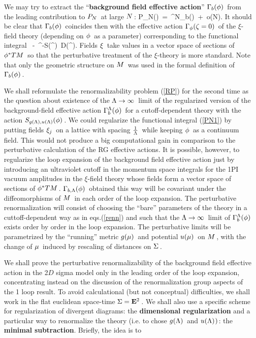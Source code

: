 \label{PN1}
\qqq
We may try to extract the ``{\bf background field
effective action}'' \s${{\Gamma}}_{b}(\phi)\hspace{0.05cm}$ from the leading
contribution to \s$P_N\hspace{0.05cm}$ at large \s$N\hspace{0.05cm}$:
\qq
P_N(\phi)\ =\ \ee^{\m N\s\Ga_{b}(\phi)\ +\ \s o(N)}\s.
\label{efab}
\qqq
It should be clear that \s$\Gamma_{b}(\phi)\hspace{0.05cm}$ coincides
then with the effective action \s${{\Gamma}}_\phi(\zeta=0)\hspace{0.05cm}$
of the \s$\xi$-field theory (depending on \s$\phi\hspace{0.05cm}$ as
a parameter) corresponding to the functional integral
\qq
\int\ -\ \s\ee^{-S(\ee^\xi\phi)}\ D(\ee^\xi\phi)\s.
\label{non}
\qqq
Fields \s$\xi\hspace{0.05cm}$ take values in a vector space of sections
of \s$\phi^*TM\hspace{0.05cm}$ so that the perturbative treatment
of the \s$\xi$-theory is more standard. Note that only
the geometric structure on \s$M\hspace{0.05cm}$ was used in the formal
definition of \s${{\Gamma}}_{b}(\phi)\hspace{0.05cm}$.
\vskip 0.5cm


We shall reformulate the renormalizability problem
(\ref{RP}) for the second time
as the question about existence
of the \s$\Lambda\to\infty\hspace{0.05cm}$ limit of the regularized
version of the background-field effective action
\s$\Gamma_{b}^{\Lambda}(\phi)\hspace{0.05cm}$ for a cutoff-dependent
theory with the action \s$S_{g(\Lambda),u(\Lambda)}(\phi)\hspace{0.05cm}$.
We could regularize the functional integral
(\ref{PN1}) by putting fields \s$\xi_j\hspace{0.05cm}$
on a lattice with spacing \s${1\over\Lambda}\hspace{0.05cm}$ while
keeping \s$\phi\hspace{0.05cm}$ as a continuum field. This would not
produce a big computational gain in comparison to
the perturbative calculation of the RG effective
actions. It is possible, however, to regularize the
loop expansion of the background field effective
action just by introducing an ultraviolet cutoff in
the momentum space integrals for the 1PI vacuum
amplitudes in the \s$\xi$-field theory whose fields
form a vector space of sections of \s$\phi^*TM\hspace{0.05cm}$.
\s${{\Gamma}}_{b,\Lambda}(\phi)\hspace{0.05cm}$ obtained this way will be
covariant under the diffeomorphisms
of \s$M\hspace{0.05cm}$ in each order of the loop expansion.
\s The perturbative renormalization
will consist of choosing the ``bare'' parameters
of the theory in a cuttoff-dependent way
as in eqs.\s\s(\ref{renn}) and such that
the \s$\Lambda\to\infty\hspace{0.05cm}$ limit of \s${{\Gamma}}_{b}^\Lambda(\phi)\hspace{0.05cm}$
exists order by order in the loop expansion.
The perturbative limits will be parametrized
by the ``running'' metric \s$g(\mu)\hspace{0.05cm}$ and potential \s$u(\mu)\hspace{0.05cm}$
on \s$M\hspace{0.05cm}$, \s with the change of \s$\mu\hspace{0.05cm}$ induced
by rescaling of distances on \s$\Sigma\hspace{0.05cm}$.
\vskip 1.2cm


\vskip 0.4cm

\no We shall prove the perturbative
renormalizability of the background field
effective action in the 2$D$ sigma model
only in the leading order of the loop expansion,
concentrating instead on the discussion
of the renormalization group aspects of the 1 loop
result. To avoid calculational
(but not conceptual) difficulties, we shall work
in the flat euclidean space-time \s$\Sigma={{\bf E}}^2\hspace{0.05cm}$.
We shall also use a specific scheme for regularization
of divergent diagrams: the {\bf dimensional regularization}
and a particular way to renormalize the theory
(i.\s\s e. to chose \s$g(\Lambda)\hspace{0.05cm}$ and \s$u(\Lambda)\hspace{0.025cm})\hspace{0.025cm}$:
\s the {\bf minimal subtraction}. Briefly, the idea
is to
\vskip 0.2cm

